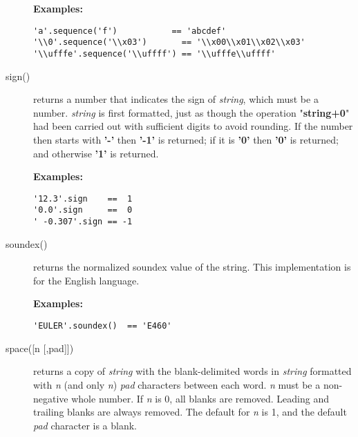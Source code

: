 \begin{description}
\textbf{Examples:}
\begin{lstlisting}
'a'.sequence('f')           == 'abcdef'
'\\0'.sequence('\\x03')       == '\\x00\\x01\\x02\\x03'
'\\ufffe'.sequence('\\uffff') == '\\ufffe\\uffff'
\end{lstlisting}

\item[sign()]\label{refsign}
returns a number that indicates the sign of \emph{string}, which
must be a number.
\emph{string} is first formatted, just as though the operation
"\textbf{string+0}" had been carried out with sufficient digits
to avoid rounding.
If the number then starts with \textbf{'-'} then \textbf{'-1'} is
returned; if it is \textbf{'0'} then \textbf{'0'} is returned; and
otherwise \textbf{'1'} is returned.
 
\textbf{Examples:}
\begin{lstlisting}
'12.3'.sign    ==  1
'0.0'.sign     ==  0
' -0.307'.sign == -1
\end{lstlisting}

\item[soundex()]\label{refsoundex}
 returns the normalized soundex value of the string. This implementation
is for the English language.  

\textbf{Examples:}
\begin{lstlisting}
'EULER'.soundex()  == 'E460'
\end{lstlisting}

\item[space([n [,pad{]]})]\label{refspace}
returns a copy of \emph{string} with the blank-delimited words in
\emph{string} formatted with \emph{n} (and only \emph{n})
\emph{pad} characters between each word.
\emph{n} must be a non-negative whole number.
If \emph{n} is 0, all blanks are removed.
Leading and trailing blanks are always removed.
The default for \emph{n} is 1, and the default \emph{pad}
character is a blank.
 

\end{description}
